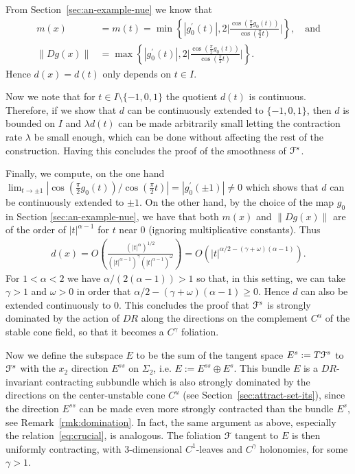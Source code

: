\documentclass[reqno,12pt,a4paper]{amsart}
\theoremstyle{plain}
\theoremstyle{definition}
\begin{document}
From Section~\ref{sec:an-example-nue} we know that
\begin{align}
  \label{eq:minimum}
  m(x)&=m(t)=\min\left\{|g_0^\prime(t)|,
    2 \Big|\frac{\cos(\frac\pi2 g_0(t))}{\cos(\frac\pi2 t)}\Big|
  \right\},\quad\text{and}
  \\
  \|Dg(x)\|&=\max\left\{|g_0^\prime(t)|,
    2 \Big|\frac{\cos(\frac\pi2 g_0(t))}{\cos(\frac\pi2 t)}\Big|
  \right\}.
\end{align}
Hence $d(x)=d(t)$ only depends on $t\in I$.  

Now we note that for $t\in I\setminus\{-1,0,1\}$ the
quotient $d(t)$ is continuous. Therefore, if we show that
$d$ can be continuously extended to $\{-1,0,1\}$, then $d$
is bounded on $I$ and $\lambda d(t)$ can be made arbitrarily
small letting the contraction rate $\lambda$ be small
enough, which can be done without affecting the rest of the
construction. Having this concludes the proof of the
smoothness of ${\EuScript{F}}^{s}$.

Finally, we compute, on the one hand
$\lim_{t\to\pm1}|{\cos(\frac\pi2
      g_0(t))/\cos(\frac\pi2 t)}|
  =|g_0^\prime(\pm1)| \neq0
$
which shows that $d$ can be continuously extended to $\pm1$.
On the other hand, by the choice of the map $g_0$ in Section
\ref{sec:an-example-nue}, we have that both $m(x)$ and
$\|Dg(x)\|$ are of the order of $|t|^{\alpha-1}$ for $t$ near
$0$ (ignoring multiplicative constants).
Thus
\begin{align}\label{eq:crucial}
  d(x)
  =O\left(\frac{(|t|^\alpha)^{1/2}}{(|t|^{\alpha-1})^\gamma
      (|t|^{\alpha-1})^\omega}\right)
  =O(|t|^{\alpha/2-(\gamma+\omega)(\alpha-1)}).
\end{align}
For $1<\alpha<2$ we have $\alpha/(2(\alpha-1)) > 1$ so that,
in this setting, we can take $\gamma>1$ and $\omega>0$ in
order that $\alpha/2-(\gamma+\omega)(\alpha-1)\ge0$.  Hence
$d$ can also be extended continuously to $0$. This concludes
the proof that ${\EuScript{F}}^{s}$ is strongly dominated by the
action of $DR$ along the directions on the complement $C^u$
of the stable cone field, so that it becomes a $C^\gamma$
foliation.

Now we define the subspace $E$ to be the sum of the tangent
space $E^{s}:=T{\EuScript{F}}^{s}$ to ${\EuScript{F}}^{s}$ with the $x_2$
direction $E^{ss}$ on $\Sigma_2$, i.e. $E:= E^{ss}\oplus E^s$.
This bundle $E$ is a $DR$-invariant contracting subbundle
which is also strongly dominated by the directions on the
center-unstable cone $C^u$ (see
Section~\ref{sec:attract-set-its}), since the direction
$E^{ss}$ can be made even more strongly contracted than the
bundle $E^{s}$, see Remark~\ref{rmk:domination}. In fact,
the same argument as above, especially the
relation~\eqref{eq:crucial}, is analogous. The foliation
${\EuScript{F}}$ tangent to $E$ is then uniformly contracting, with
$3$-dimensional $C^1$-leaves and $C^\gamma$ holonomies, for
some $\gamma>1$.
\end{document}
